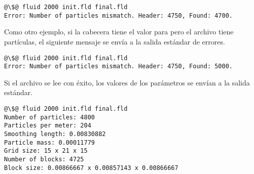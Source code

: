 \begin{lstlisting}[style=terminal,escapechar=@]
@\$@ fluid 2000 init.fld final.fld
Error: Number of particles mismatch. Header: 4750, Found: 4700.
\end{lstlisting}

Como otro ejemplo, si la cabecera tiene el valor  para 
pero el archivo tiene  partículas, el siguiente mensaje se envía a 
la salida estándar de errores.

\begin{lstlisting}[style=terminal,escapechar=@]
@\$@ fluid 2000 init.fld final.fld
Error: Number of particles mismatch. Header: 4750, Found: 5000.
\end{lstlisting}

Si el archivo se lee con éxito, los valores de los parámetros se envían a la
salida estándar.

\begin{lstlisting}[style=terminal,escapechar=@]
@\$@ fluid 2000 init.fld final.fld
Number of particles: 4800
Particles per meter: 204
Smoothing length: 0.00830882
Particle mass: 0.00011779
Grid size: 15 x 21 x 15
Number of blocks: 4725
Block size: 0.00866667 x 0.00857143 x 0.00866667
\end{lstlisting}

